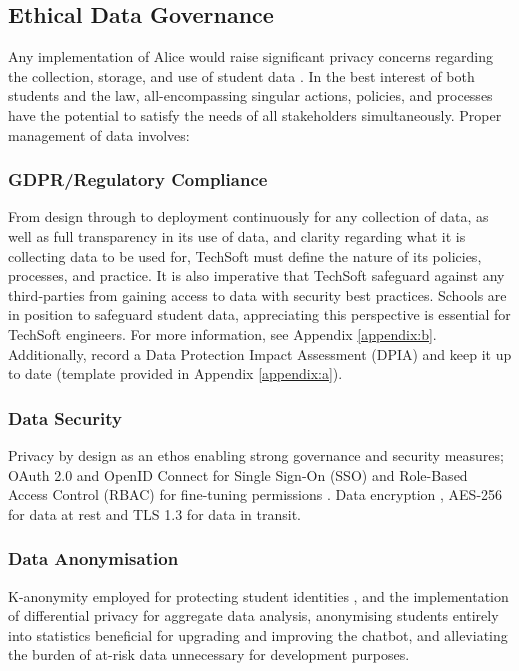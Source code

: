\documentclass[14pt,a4paper]{article}
\begin{document}
\begin{multicols}{2}
\subsection{Ethical Data Governance}
Any implementation of Alice would raise significant privacy concerns regarding the collection, storage, and use of student data \textit{\parencite[pp. 366-370]{Annus2024}}. In the best interest of both students and the law, all-encompassing singular actions, policies, and processes have the potential to satisfy the needs of all stakeholders simultaneously.
Proper management of data involves:

\subsubsection{GDPR/Regulatory Compliance}
From design through to deployment continuously for any collection of data, as well as full transparency in its use of data, and clarity regarding what it is collecting data to be used for, TechSoft must define the nature of its policies, processes, and practice.
It is also imperative that TechSoft safeguard against any third-parties from gaining access to data with security best practices.
Schools are in position to safeguard student data, appreciating this perspective is essential for TechSoft engineers.
For more information, see Appendix \ref{appendix:b}.
Additionally, record a Data Protection Impact Assessment (DPIA) and keep it up to date (template provided in Appendix \ref{appendix:a}).

\subsubsection{Data Security}
Privacy by design as an ethos enabling strong governance and security measures;
OAuth 2.0 and OpenID Connect for Single Sign-On (SSO) and Role-Based Access Control (RBAC) for fine-tuning permissions \textit{\parencite[pp. 80-120]{Josuttis2024}}.
Data encryption \textit{\parencite[pp. 100-150]{Stallings2024}}, AES-256 for data at rest and TLS 1.3 for data in transit.

\subsubsection{Data Anonymisation}
K-anonymity employed for protecting student identities \textit{\parencite[pp. 75-100]{ElEmamArbuckle2024}}, and the implementation of differential privacy for aggregate data analysis, anonymising students entirely into statistics beneficial for upgrading and improving the chatbot, and alleviating the burden of at-risk data unnecessary for development purposes.


\end{multicols}
\end{document}
